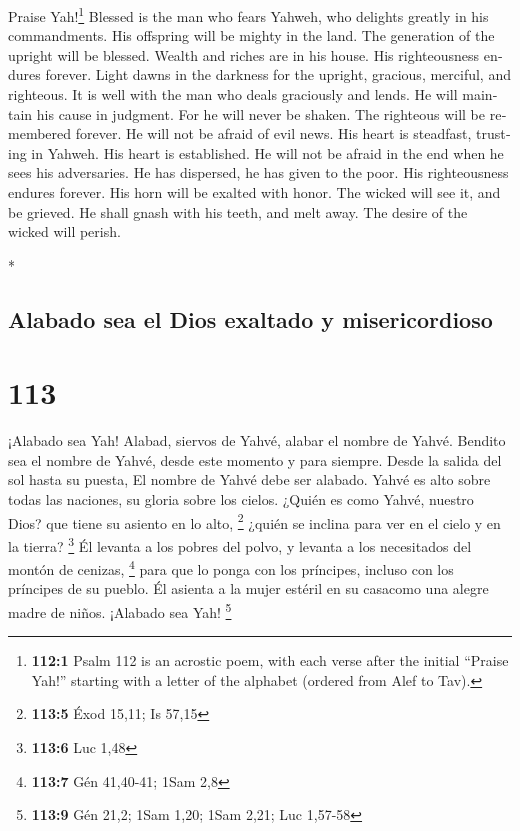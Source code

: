 \begin{paracol}{2}
\begin{otherlanguage}{english}
 Praise Yah!\footnote{\textbf{112:1} Psalm 112 is an
  acrostic poem, with each verse after the initial ``Praise Yah!''
  starting with a letter of the alphabet (ordered from Alef to Tav).}
Blessed is the man who fears Yahweh, who delights greatly in his
commandments.  His offspring will be mighty in the land.
The generation of the upright will be blessed.  Wealth and
riches are in his house. His righteousness endures forever.
 Light dawns in the darkness for the upright, gracious,
merciful, and righteous.  It is well with the man who
deals graciously and lends. He will maintain his cause in judgment.
 For he will never be shaken. The righteous will be
remembered forever.  He will not be afraid of evil news.
His heart is steadfast, trusting in Yahweh.  His heart is
established. He will not be afraid in the end when he sees his
adversaries.  He has dispersed, he has given to the poor.
His righteousness endures forever. His horn will be exalted with honor.
 The wicked will see it, and be grieved. He shall gnash
with his teeth, and melt away. The desire of the wicked will perish.

\end{otherlanguage}

\switchcolumn[0]*

\hypertarget{alabado-sea-el-dios-exaltado-y-misericordioso}{%
\subsection{Alabado sea el Dios exaltado y
misericordioso}\label{alabado-sea-el-dios-exaltado-y-misericordioso}}

\hypertarget{section-224}{%
\section{113}\label{section-224}}

 ¡Alabado sea Yah! Alabad, siervos de Yahvé, alabar el
nombre de Yahvé.  Bendito sea el nombre de Yahvé, desde
este momento y para siempre.  Desde la salida del sol
hasta su puesta, El nombre de Yahvé debe ser alabado. 
Yahvé es alto sobre todas las naciones, su gloria sobre los cielos.
 ¿Quién es como Yahvé, nuestro Dios? que tiene su asiento
en lo alto, \footnote{\textbf{113:5} Éxod 15,11; Is 57,15}
 ¿quién se inclina para ver en el cielo y en la tierra?
\footnote{\textbf{113:6} Luc 1,48}  Él levanta a los
pobres del polvo, y levanta a los necesitados del montón de cenizas,
\footnote{\textbf{113:7} Gén 41,40-41; 1Sam 2,8}  para que
lo ponga con los príncipes, incluso con los príncipes de su pueblo.
 Él asienta a la mujer estéril en su casacomo una alegre
madre de niños. ¡Alabado sea Yah! \footnote{\textbf{113:9} Gén 21,2;
  1Sam 1,20; 1Sam 2,21; Luc 1,57-58}


\end{paracol}
